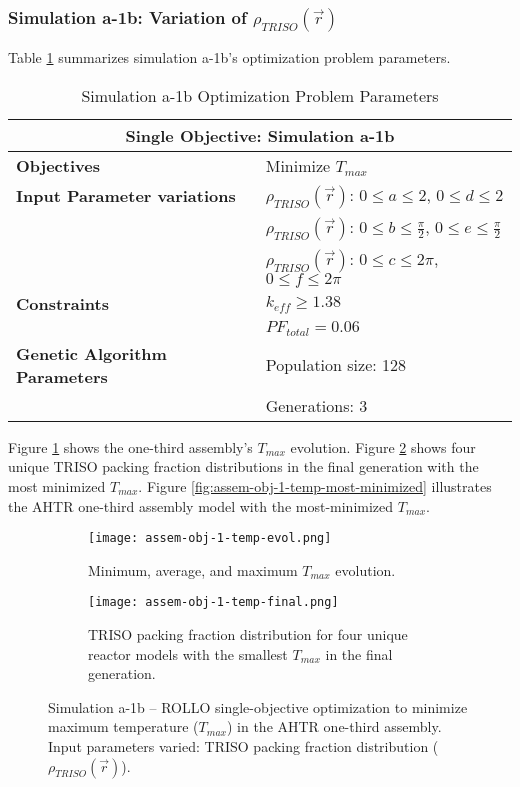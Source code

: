 \subsubsection{Simulation a-1b: Variation of $\rho_{TRISO}(\vec{r})$}
Table \ref{tab:simulationa1b} summarizes simulation a-1b's optimization problem parameters. 
\begin{table}[htbp!]
    \centering
    \onehalfspacing
    \caption{Simulation a-1b Optimization Problem Parameters}
	\label{tab:simulationa1b}
    \footnotesize
    \begin{tabular}{l|p{5.3cm}}
    \hline 
    \multicolumn{2}{c}{\textbf{Single Objective: Simulation a-1b}} \\
    \hline 
    \textbf{Objectives} & Minimize $T_{max}$ \\
    \hline 
    \textbf{Input Parameter variations} 
    & $\rho_{TRISO}(\vec{r})$: $0 \leq a \leq 2$, $0 \leq d \leq 2$\\
    & $\rho_{TRISO}(\vec{r})$: $0 \leq b \leq \frac{\pi}{2}$, $0 \leq e \leq \frac{\pi}{2}$\\
    & $\rho_{TRISO}(\vec{r})$: $0 \leq c \leq 2\pi$, $0 \leq f \leq 2\pi$\\
    \hline
    \textbf{Constraints} & $k_{eff} \geq 1.38$\\ 
    & $PF_{total} = 0.06 $\\ 
    \hline 
    \textbf{Genetic Algorithm Parameters} & Population size: 128 \\
    & Generations: 3 \\
    \hline
    \end{tabular}
\end{table}
Figure \ref{fig:assem-obj-1-temp-evol} shows the one-third assembly's $T_{max}$ 
evolution. 
Figure \ref{fig:assem-obj-1-temp-final} shows four unique TRISO packing fraction 
distributions in the final generation with the most minimized $T_{max}$. 
Figure \ref{fig:assem-obj-1-temp-most-minimized} illustrates the \gls{AHTR} one-third 
assembly model with the most-minimized $T_{max}$. 
\begin{figure}[htbp!]
    \begin{subfigure}{\textwidth}
        \centering
        \texttt{[image: assem-obj-1-temp-evol.png]}
        \caption{Minimum, average, and maximum $T_{max}$ evolution.}
        \label{fig:assem-obj-1-temp-evol} 
    \end{subfigure}
    \begin{subfigure}{\textwidth}
        \centering
        \texttt{[image: assem-obj-1-temp-final.png]}
        \caption{TRISO packing fraction distribution for four unique reactor models with the 
        smallest $T_{max}$ in the final generation.}
        \label{fig:assem-obj-1-temp-final} 
    \end{subfigure}
    \caption{Simulation a-1b -- ROLLO single-objective optimization to minimize maximum 
    temperature ($T_{max}$) in the \gls{AHTR} one-third assembly. 
    Input parameters varied: \gls{TRISO} packing fraction distribution 
    ($\rho_{TRISO}(\vec{r})$).}
    \label{fig:assem-obj-1-temp}
\end{figure}
